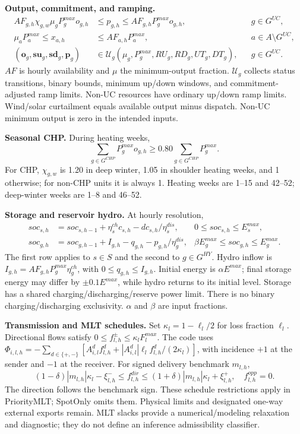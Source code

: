 \documentclass[11pt,a4paper]{article}
\newcommand{\family}[1]{\textbf{#1}}
\begin{document}
\newpage
\family{Output, commitment, and ramping.}
\begin{align}
AF_{g,h}\chi_{g,w}\mu_gP_g^{max}o_{g,h}
&\le p_{g,h}\le AF_{g,h}P_g^{max}o_{g,h},&&g\in G^{UC},\label{eq:output}\\
\mu_aP_a^{max}\le x_{a,h}&\le AF_{a,h}P_a^{max},&&a\in A\setminus G^{UC},\\
(\boldsymbol{o}_g,\boldsymbol{su}_g,\boldsymbol{sd}_g,\boldsymbol{p}_g)
&\in\mathcal U_g(\mu_g,P_g^{max},RU_g,RD_g,UT_g,DT_g),&&g\in G^{UC}.
\end{align}
$AF$ is hourly availability and $\mu$ the minimum-output fraction.
$\mathcal U_g$ collects status transitions, binary bounds, minimum up/down
windows, and commitment-adjusted ramp limits. Non-UC resources have ordinary
up/down ramp limits. Wind/solar curtailment equals available output minus
dispatch. Non-UC minimum output is zero in the intended inputs.

\family{Seasonal CHP.} During heating weeks,
\begin{equation}
\sum_{g\in G^{CHP}}P_g^{max}o_{g,h}\ge
0.80\sum_{g\in G^{CHP}}P_g^{max}.\label{eq:chp}
\end{equation}
For CHP, $\chi_{g,w}$ is 1.20 in deep winter, 1.05 in shoulder heating weeks,
and 1 otherwise; for non-CHP units it is always 1. Heating weeks are 1--15
and 42--52; deep-winter weeks are 1--8 and 46--52.

\family{Storage and reservoir hydro.} At hourly resolution,
\begin{align}
soc_{s,h}&=soc_{s,h-1}+\eta_s^{ch}c_{s,h}-dc_{s,h}/\eta_s^{dis},
&0\le soc_{s,h}\le E_s^{max},\\
soc_{g,h}&=soc_{g,h-1}+I_{g,h}-q_{g,h}-p_{g,h}/\eta_g^{dis},
&\beta E_g^{max}\le soc_{g,h}\le E_g^{max}.
\end{align}
The first row applies to $s\in S$ and the second to $g\in G^{HY}$.
Hydro inflow is $I_{g,h}=AF_{g,h}P_g^{max}\eta_g^{ch}$, with
$0\le q_{g,h}\le I_{g,h}$. Initial energy is $\alpha E^{max}$; final storage
energy may differ by $\pm0.1E^{max}$, while hydro returns to its initial level.
Storage has a shared charging/discharging/reserve power limit. There is no
binary charging/discharging exclusivity. $\alpha$ and $\beta$ are input fractions.

\family{Transmission and MLT schedules.} Set $\kappa_l=1-\ell_l/2$ for loss
fraction $\ell_l$. Directional flows satisfy $0\le f^\pm_{l,h}\le\kappa_lF_l^{max}$.
The code uses $\Phi_{i,l,h}=-\sum_{d\in\{+,-\}}[A^d_{i,l}f^d_{l,h}
+|A^d_{i,l}|\ell_l f^d_{l,h}/(2\kappa_l)]$, with incidence $+1$ at the sender
and $-1$ at the receiver. For signed delivery benchmark $m_{l,h}$,
\begin{equation}
(1-\delta)|m_{l,h}|\kappa_l-\xi^-_{l,h}\le f^{dir}_{l,h}
\le(1+\delta)|m_{l,h}|\kappa_l+\xi^+_{l,h},\quad f^{opp}_{l,h}=0.\label{eq:mlt}
\end{equation}
The direction follows the benchmark sign. These schedule restrictions apply
in PriorityMLT; SpotOnly omits them. Physical limits and designated one-way
external exports remain. MLT slacks provide a numerical/modeling relaxation
and diagnostic; they do not define an inference admissibility classifier.
\end{document}

